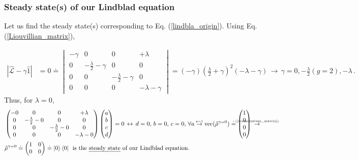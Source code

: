 \documentclass[11pt]{article}
\numberwithin{equation}{section} %
\numberwithin{figure}{section} %
\begin{document}
\begin{appendices}
\subsubsection{Steady state(s) of our Lindblad equation}
Let us find the steady state(s) corresponding to Eq. (\ref{lindbla_origin}). Using Eq. (\ref{Liouvillian_matrix}),

\begin{equation} 
\begin{split}
|\hat{\mathcal{L}}-\gamma\hat{1}|
&=0 \doteq \begin{vmatrix}-{\gamma}&0&0&+\lambda\\0&-\frac{\lambda}{2} -{\gamma}&0&0\\0&0&-\frac{\lambda}{2}-{\gamma}&0\\0&0&0&-\lambda-{\gamma}\end{vmatrix} = (-{\gamma})(\frac{\lambda}{2}+{\gamma})^2 (-\lambda-{\gamma}) \, \rightarrow \, \gamma= 0,-\frac{\lambda}{2} (g=2), -\lambda
\,\textrm{.}
\end{split}
\end{equation}
Thus, for $\lambda=0$, 
\begin{equation}
\begin{split}
&\begin{pmatrix}-{0}&0&0&+\lambda\\0&-\frac{\lambda}{2} -{0}&0&0\\0&0&-\frac{\lambda}{2}-{0}&0\\0&0&0&-\lambda-{0}\end{pmatrix} \begin{pmatrix}a\\b\\c\\d\\\end{pmatrix}=0 \, \leftrightarrow \, d=0,\,b=0,\,c=0,\,\forall a \,\,\newcommand\myeq1{\mathrel{\stackrel{\makebox[0pt]{\mbox{\normalfont\tiny \textrm{a=1}}}}{\rightarrow}}}\,\, \textrm{vec}(\hat{\rho}^{\gamma=0}) \doteq  \begin{pmatrix}1\\0\\0\\0\end{pmatrix}  \,\,\newcommand\myek1{\mathrel{\stackrel{\makebox[0pt]{\mbox{\normalfont\tiny \textrm{(\ref{vectorization_matrix})}}}}{\rightarrow}}}\\
&\hat{\rho}^{\gamma=0} \doteq \begin{pmatrix}1&0\\0&0\end{pmatrix} \doteq \ket{0}\bra{0}\,\,\,\textrm{is the \emph{steady state} of our Lindblad equation.}
\end{split}
\end{equation}





\end{appendices}
\end{document}
